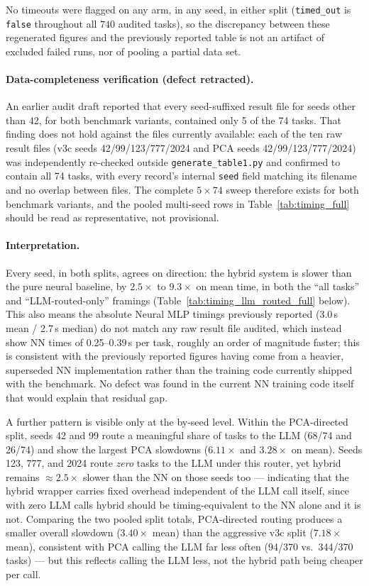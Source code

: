 \documentclass[twoside,11pt]{article}
\begin{document}
No timeouts were flagged on any arm, in any seed, in either split
(\texttt{timed\_out} is \texttt{false} throughout all $740$ audited
tasks), so the discrepancy between these regenerated figures and the
previously reported table is not an artifact of excluded failed runs, nor
of pooling a partial data set.

\paragraph{Data-completeness verification (defect retracted).}
\label{sec:timing_data_defect}
An earlier audit draft reported that every seed-suffixed result file for
seeds other than 42, for both benchmark variants, contained only 5 of the
74 tasks. That finding does not hold against the files currently
available: each of the ten raw result files (v3c seeds 42/99/123/777/2024
and PCA seeds 42/99/123/777/2024) was independently re-checked outside
\texttt{generate\_table1.py} and confirmed to contain all 74 tasks, with
every record's internal \texttt{seed} field matching its filename and no
overlap between files. The complete $5\times74$ sweep therefore exists for
both benchmark variants, and the pooled multi-seed rows in
Table~\ref{tab:timing_full} should be read as representative, not
provisional.

\paragraph{Interpretation.}
Every seed, in both splits, agrees on direction: the hybrid system is
slower than the pure neural baseline, by $2.5\times$ to $9.3\times$ on
mean time, in both the ``all tasks'' and ``LLM-routed-only'' framings
(Table~\ref{tab:timing_llm_routed_full} below). This also means the
absolute Neural MLP timings previously reported (3.0\,s mean / 2.7\,s
median) do not match any raw result file audited, which instead show NN
times of 0.25--0.39\,s per task, roughly an order of magnitude faster;
this is consistent with the previously reported figures having come from a
heavier, superseded NN implementation rather than the training code
currently shipped with the benchmark. No defect was found in the current
NN training code itself that would explain that residual gap.

A further pattern is visible only at the by-seed level. Within the
PCA-directed split, seeds 42 and 99 route a meaningful share of tasks to
the LLM (68/74 and 26/74) and show the largest PCA slowdowns ($6.11\times$
and $3.28\times$ on mean). Seeds 123, 777, and 2024 route \emph{zero}
tasks to the LLM under this router, yet hybrid remains
$\approx\!2.5\times$ slower than the NN on those seeds too --- indicating
that the hybrid wrapper carries fixed overhead independent of the LLM
call itself, since with zero LLM calls hybrid should be
timing-equivalent to the NN alone and it is not. Comparing the two pooled
split totals, PCA-directed routing produces a smaller overall slowdown
($3.40\times$ mean) than the aggressive v3c split ($7.18\times$ mean),
consistent with PCA calling the LLM far less often (94/370 vs.\ 344/370
tasks) --- but this reflects calling the LLM less, not the hybrid path
being cheaper per call.
\end{document}
